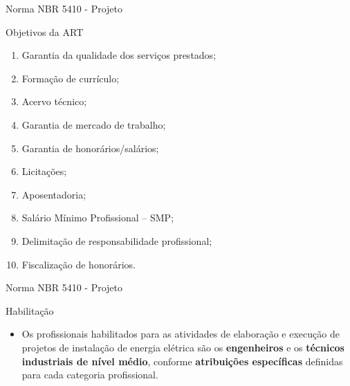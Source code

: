\begin{frame}{Norma NBR 5410 - Projeto}
	\begin{block}{Objetivos da ART}
		\begin{enumerate}[a]
			\item Garantia da qualidade dos serviços prestados;
			\item Formação de currículo;
			\item Acervo técnico;
			\item Garantia de mercado de trabalho;
			\item Garantia de honorários/salários;
			\item Licitações;
			\item Aposentadoria;
			\item Salário Mínimo Profissional – SMP;
			\item Delimitação de responsabilidade profissional;
			\item Fiscalização de honorários.
		\end{enumerate}

	\end{block}



\end{frame}

\begin{frame}{Norma NBR 5410 - Projeto}
	\begin{block}{Habilitação}
		\begin{itemize}
			\item Os profissionais habilitados para as atividades de elaboração e execução de projetos de instalação de energia elétrica são os \textbf{engenheiros} e os \textbf{técnicos industriais de nível médio}, conforme \textbf{atribuições específicas} definidas para cada categoria profissional.
		\end{itemize}
	\end{block}
\end{frame}


